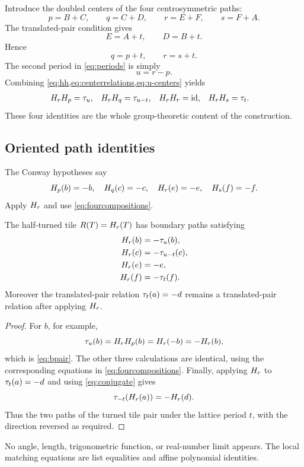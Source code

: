 Introduce the doubled centers of the four centrosymmetric paths:
\begin{equation}
 p=B+C,
 \qquad q=C+D,
 \qquad r=E+F,
 \qquad s=F+A.
 \label{eq:centers}
\end{equation}
The translated-pair condition gives
\begin{equation}
 E=A+t,
 \qquad D=B+t.
 \label{eq:endpointtranslation}
\end{equation}
Hence
\begin{equation}
 q=p+t,
 \qquad r=s+t.
 \label{eq:centerrelations}
\end{equation}
The second period in \cref{eq:periods} is simply
\begin{equation}
 u=r-p.
 \label{eq:u-centers}
\end{equation}
Combining \cref{eq:hh,eq:centerrelations,eq:u-centers} yields
\begin{align}
 H_{r}H_{p}&=\tau_{u},
 &H_{r}H_{q}&=\tau_{u-t},
 &H_{r}H_{r}&=\operatorname{id},
 &H_{r}H_{s}&=\tau_{t}.
 \label{eq:fourcompositions}
\end{align}
These four identities are the whole group-theoretic content of the construction.

\subsection{Oriented path identities}

The Conway hypotheses say
\[
 H_{p}(b)=-b,
 \quad H_{q}(c)=-c,
 \quad H_{r}(e)=-e,
 \quad H_{s}(f)=-f.
\]
Apply \(H_{r}\) and use \cref{eq:fourcompositions}.

\begin{lemma}
\label{lem:orbitpairs}
The half-turned tile \(R(T)=H_{r}(T)\) has boundary paths satisfying
\begin{align}
 H_{r}(b)&=-\tau_{u}(b),\label{eq:bpair}\\
 H_{r}(c)&=-\tau_{u-t}(c),\label{eq:cpair}\\
 H_{r}(e)&=-e,\label{eq:epair}\\
 H_{r}(f)&=-\tau_{t}(f).\label{eq:fpair}
\end{align}
Moreover the translated-pair relation \(\tau_{t}(a)=-d\) remains a translated-pair relation after applying \(H_{r}\).
\end{lemma}
\begin{proof}
For \(b\), for example,
\[
 \tau_{u}(b)=H_{r}H_{p}(b)=H_{r}(-b)=-H_{r}(b),
\]
which is \cref{eq:bpair}.  The other three calculations are identical, using the corresponding equations in \cref{eq:fourcompositions}.  Finally, applying \(H_{r}\) to \(\tau_{t}(a)=-d\) and using \cref{eq:conjugate} gives
\[
 \tau_{-t}(H_{r}(a))=-H_{r}(d).
\]
Thus the two paths of the turned tile pair under the lattice period \(t\), with the direction reversed as required.
\end{proof}

No angle, length, trigonometric function, or real-number limit appears.  The local matching equations are list equalities and affine polynomial identities.
